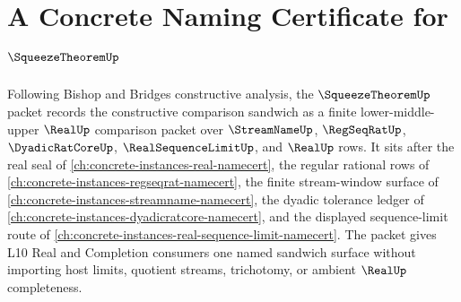 \chapter{A Concrete Naming Certificate for $\SqueezeTheoremUp$}
\label{ch:concrete-instances-squeeze-theorem-namecert}

Following Bishop and Bridges constructive analysis, the $\SqueezeTheoremUp$ packet records the constructive comparison sandwich as a finite lower-middle-upper $\RealUp$ comparison packet over $\StreamNameUp$, $\RegSeqRatUp$, $\DyadicRatCoreUp$, $\RealSequenceLimitUp$, and $\RealUp$ rows. It sits after the real seal of \autoref{ch:concrete-instances-real-namecert}, the regular rational rows of \autoref{ch:concrete-instances-regseqrat-namecert}, the finite stream-window surface of \autoref{ch:concrete-instances-streamname-namecert}, the dyadic tolerance ledger of \autoref{ch:concrete-instances-dyadicratcore-namecert}, and the displayed sequence-limit route of \autoref{ch:concrete-instances-real-sequence-limit-namecert}. The packet gives L10 Real and Completion consumers one named sandwich surface without importing host limits, quotient streams, trichotomy, or ambient $\RealUp$ completeness.

